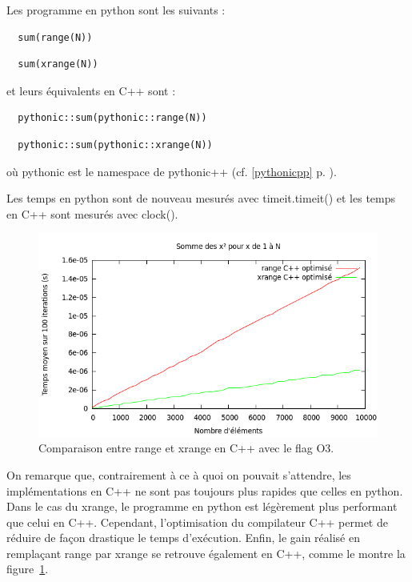 \documentclass[a4paper]{article}
\begin{document}
Les programme en python sont les suivants :

\begin{verbatim}
  sum(range(N))
\end{verbatim}

\begin{verbatim}
  sum(xrange(N))
\end{verbatim}

et leurs équivalents en C++ sont :

\begin{verbatim}
  pythonic::sum(pythonic::range(N))
\end{verbatim}

\begin{verbatim}
  pythonic::sum(pythonic::xrange(N))
\end{verbatim}

où pythonic est le namespace de pythonic++ (cf. \ref{pythonicpp} p. \pageref{pythonicpp}).

Les temps en python sont de nouveau mesurés avec timeit.timeit() et les temps en C++ sont mesurés avec clock().

\begin{figure}[h]
  \includegraphics[scale=0.5]{./Pictures/RangeXrangeCppO3}
  \caption{Comparaison entre range et xrange en C++ avec le flag O3.}
  \label{RangeXrangeCppO3}
\end{figure}

On remarque que, contrairement à ce à quoi on pouvait s'attendre, les implémentations en C++ ne sont pas toujours plus rapides que celles en python. Dans le cas du xrange, le programme en python est légèrement plus performant que celui en C++. Cependant, l'optimisation du compilateur C++ permet de réduire de façon drastique le temps d'exécution. Enfin, le gain réalisé en remplaçant range par xrange se retrouve également en C++, comme le montre la figure~\ref{RangeXrangeCppO3}. 
\end{document}

